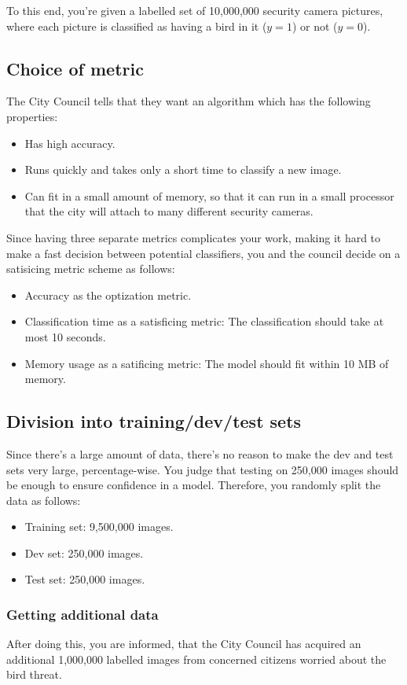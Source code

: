 \documentclass[12pt, a4paper]{article}
\numberwithin{equation}{section}
\begin{document}
To this end, you're given a labelled set of 10,000,000 security camera pictures, where each picture is classified as having a bird in it ($y=1$) or not ($y=0$).

\subsection{Choice of metric}
The City Council tells that they want an algorithm which has the following properties:
\begin{itemize}
\item Has high accuracy.
\item Runs quickly and takes only a short time to classify a new image.
\item Can fit in a small amount of memory, so that it can run in a small processor that the city will attach to many different security cameras.
\end{itemize}
Since having three separate metrics complicates your work, making it hard to make a fast decision between potential classifiers, you and the council decide on a satisicing metric scheme as follows:
\begin{itemize}
\item Accuracy as the optization metric.
\item Classification time as a satisficing metric: The classification should take at most 10 seconds.
\item Memory usage as a satificing metric: The model should fit within 10 MB of memory.
\end{itemize}

\subsection{Division into training/dev/test sets}
Since there's a large amount of data, there's no reason to make the dev and test sets very large, percentage-wise. You judge that testing on 250,000 images should be enough to ensure confidence in a model. Therefore, you randomly split the data as follows:
\begin{itemize}
\item Training set: 9,500,000 images.
\item Dev set: 250,000 images.
\item Test set: 250,000 images.
\end{itemize}

\subsubsection{Getting additional data}
After doing this, you are informed, that the City Council has acquired an additional 1,000,000 labelled images from concerned citizens worried about the bird threat.
\end{document}
